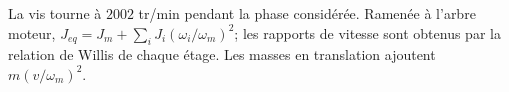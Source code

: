 \begin{corrigebox}
La vis tourne à $2002$ tr/min pendant la phase considérée.
Ramenée à l'arbre moteur,
                $J_{eq}=J_m+\sum_iJ_i(\omega_i/\omega_m)^2$; les rapports de vitesse sont
                obtenus par la relation de Willis de chaque étage. Les masses en
                translation ajoutent $m(v/\omega_m)^2$.
\end{corrigebox}
